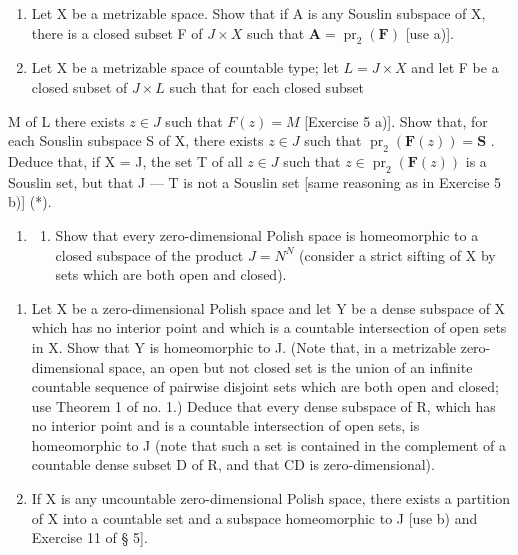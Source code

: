 \begin{enumerate}
\def\labelenumi{\alph{enumi})}
\setcounter{enumi}{1}
\item
  Let X be a metrizable space. Show that if A is any Souslin subspace of X, there is a closed subset F of \(J \times X\) such that \(\mathbf{A} = \operatorname{pr}_{2}(\mathbf{F})\) {[}use a){]}.
\item
  Let X be a metrizable space of countable type; let \(L = J \times X\) and let F be a closed subset of \(J \times L\) such that for each closed subset
\end{enumerate}

M of L there exists \(z \in J\) such that \(F(z) = M\) {[}Exercise 5 a){]}. Show that, for each Souslin subspace S of X, there exists \(z \in J\) such that \(\operatorname{pr}_{2}(\mathbf{F}(z)) = \mathbf{S}\) . Deduce that, if X = J, the set T of all \(z \in J\) such that \(z \in \operatorname{pr}_{2}(\mathbf{F}(z))\) is a Souslin set, but that J --- T is not a Souslin set {[}same reasoning as in Exercise 5 b){]} (*).

\begin{enumerate}
\def\labelenumi{\arabic{enumi})}
\setcounter{enumi}{6}
\tightlist
\item
  \begin{enumerate}
  \def\labelenumii{\alph{enumii})}
  \tightlist
  \item
    Show that every zero-dimensional Polish space is homeomorphic to a closed subspace of the product \(J = N^{N}\) (consider a strict sifting of X by sets which are both open and closed).
  \end{enumerate}
\end{enumerate}

\begin{enumerate}
\def\labelenumi{\alph{enumi})}
\setcounter{enumi}{1}
\item
  Let X be a zero-dimensional Polish space and let Y be a dense subspace of X which has no interior point and which is a countable intersection of open sets in X. Show that Y is homeomorphic to J. (Note that, in a metrizable zero-dimensional space, an open but not closed set is the union of an infinite countable sequence of pairwise disjoint sets which are both open and closed; use Theorem 1 of no. 1.) Deduce that every dense subspace of R, which has no interior point and is a countable intersection of open sets, is homeomorphic to J (note that such a set is contained in the complement of a countable dense subset D of R, and that CD is zero-dimensional).
\item
  If X is any uncountable zero-dimensional Polish space, there exists a partition of X into a countable set and a subspace homeomorphic to J {[}use b) and Exercise 11 of § 5{]}.
\end{enumerate}

